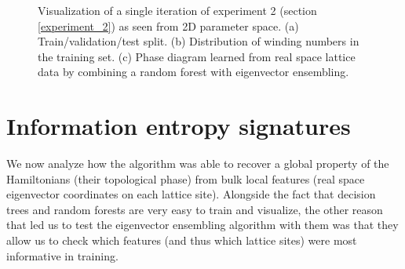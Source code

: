 \documentclass[10pt]{revtex4-1}
\begin{document}
\begin{figure}
\centering
{}\quad
{}
\caption{Visualization of a single iteration of experiment 2 (section \ref{experiment_2}) as seen from 2D parameter space. (a) Train/validation/test split. (b) Distribution of winding numbers in the training set. (c) Phase diagram learned from real space lattice data by combining a random forest with eigenvector ensembling.}
\label{figexp2_exp}
\end{figure}

\section{Information entropy signatures}
\label{information_entropy_signatures}

We now analyze how the algorithm was able to recover a global property of the Hamiltonians (their topological phase) from bulk local features (real space eigenvector coordinates on each lattice site). Alongside the fact that decision trees and random forests are very easy to train and visualize, the other reason that led us to test the eigenvector ensembling algorithm with them was that they allow us to check which features (and thus which lattice sites) were most informative in training.
\end{document}
